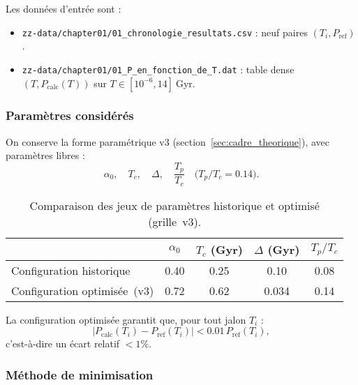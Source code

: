 Les données d’entrée sont :
\begin{itemize}
  \item \texttt{zz-data/chapter01/01\_chronologie\_resultats.csv} :  
        neuf paires \((T_i,P_{\mathrm{ref}})\).
  \item \texttt{zz-data/chapter01/01\_P\_en\_fonction\_de\_T.dat} :  
        table dense \((T,P_{\mathrm{calc}}(T))\) sur \(T\in[10^{-6},14]\) Gyr.
\end{itemize}

\subsubsection{Paramètres considérés}
On conserve la forme paramétrique v3 (section~\ref{sec:cadre_theorique}),  
avec paramètres libres :
\[
  \alpha_{0},\quad T_{c},\quad \Delta,\quad \frac{T_{p}}{T_{c}}\quad\bigl(T_{p}/T_{c}=0.14\bigr).
\]

\begin{table}[htbp]
  \centering
  \begin{tabular}{l S S S S}
    \toprule
     & {$\alpha_{0}$} & {$T_{c}$ (Gyr)} & {$\Delta$ (Gyr)} & {$T_{p}/T_{c}$} \\
    \midrule
    Configuration historique   & 0.40  & 0.25   & 0.10   & 0.08 \\
    Configuration optimisée~(v3) & 0.72  & 0.62   & 0.034  & 0.14 \\
    \bottomrule
  \end{tabular}
  \caption{Comparaison des jeux de paramètres historique et optimisé (grille~v3).}
  \label{tab:parametres_calibration}
\end{table}

La configuration optimisée garantit que, pour tout jalon \(T_{i}\) :
\[
  \bigl|P_{\mathrm{calc}}(T_{i}) - P_{\mathrm{ref}}(T_{i})\bigr|
  < 0.01\,P_{\mathrm{ref}}(T_{i}),
\]
c’est-à-dire un écart relatif \(<1\%\).

\subsubsection{Méthode de minimisation}

